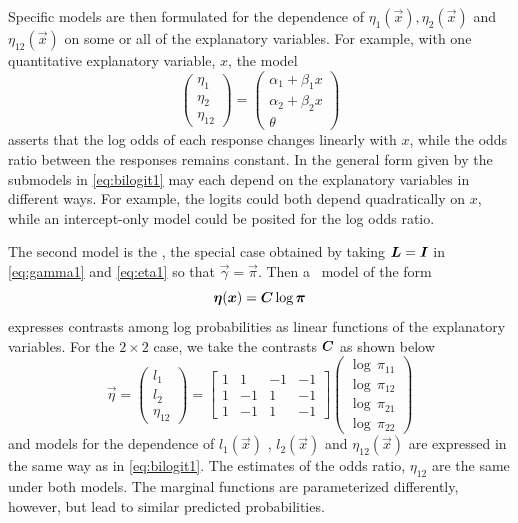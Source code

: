 \documentclass[11pt]{book}\usepackage[]{graphicx}\usepackage[]{color}
\begin{document}
Specific models are then formulated for the dependence of $\eta _1 (\vec{x})
, \eta _2 (\vec{x}) $ and $\eta _{12}(\vec{x}) $
on some or all of the explanatory variables. For example, with one quantitative
explanatory variable, $x$, the model
\begin{equation}\label{eq:bilogit1}
\left(
\begin{array}{c}
\eta _1 \\
\eta _2 \\
\eta _{12}
\end{array}
\right) =\left(
\begin{array}{c}
\alpha _1+\beta _1 x \\
\alpha _2+\beta _2 x \\
\theta
\end{array}
\right)
\end{equation}
asserts that the log odds of each response changes linearly with $x$, while
the odds ratio between the responses remains constant. In the general form
given by \cite{McCullaghNelder:89} the submodels in \eqref{eq:bilogit1} may
each depend on the explanatory variables in different ways.
For example, the logits could both depend quadratically on $x$,
while an intercept-only model could be posited for the log odds ratio.

The second model is the ,
the special case obtained by taking
$\bm{L}=\bm{I}$ in \eqref{eq:gamma1} and \eqref{eq:eta1}
so that $\vec{\gamma} = \vec{\pi}$.
Then a \loglin\ model of the form
\begin{equation*}
\bm{\eta } ( \bm{x} ) = \bm{C} \log \bm{\pi}
\end{equation*}
expresses contrasts among log probabilities as linear functions of
the explanatory variables.  For the $2 \times 2$ case, we take the
contrasts $\bm{C}$ as shown below
\begin{equation}\label{eq:eta3}
 \vec{\eta }=\left(
 \begin{array}{c}
  l_1 \\
  l_2 \\
  \eta _{12}
 \end{array}
 \right) =\left[
 \begin{array}{rrrr}
  1 & 1 & -1 & -1 \\
  1 & -1 & 1 & -1 \\
  1 & -1 & 1 & -1
 \end{array}
\right] \left(
 \begin{array}{c}
  \log \,\pi_{11} \\
  \log \,\pi_{12} \\
  \log \,\pi_{21} \\
  \log \,\pi_{22}
 \end{array}
\right)
\end{equation}
and models for the dependence of
$l_1( \vec{x})$ , $l_2(\vec{x}) $ and $\eta _{12}(\vec{x})$
are expressed in the same way as in \eqref{eq:bilogit1}.
The estimates of the odds ratio, $\eta_{12}$ are the same under both
models.  The marginal functions are parameterized differently, however,
but lead to similar predicted probabilities.
\end{document}
